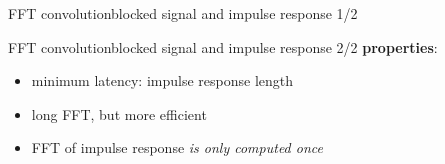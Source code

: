 \begin{frame}{FFT convolution}{blocked signal and impulse response 1/2}
{\begin{figure}
	\end{figure}
	}
	\vspace{50mm}
\end{frame}

\begin{frame}{FFT convolution}{blocked signal and impulse response 2/2}
	\textbf{properties}:
	\begin{itemize}
		\item	minimum latency: impulse response length
		\item	long FFT, but more efficient
		\item	FFT of impulse response \textit{is only computed once}
	\end{itemize}
\end{frame}

